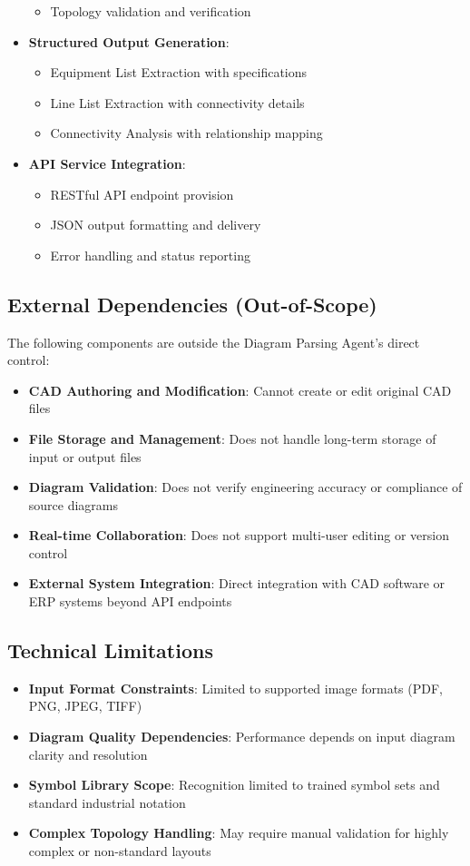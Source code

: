 \documentclass[12pt]{report}
\begin{document}
\begin{itemize}
\begin{itemize}
      \item Topology validation and verification
    \end{itemize}
  \item \textbf{Structured Output Generation}:
    \begin{itemize}
      \item Equipment List Extraction with specifications
      \item Line List Extraction with connectivity details
      \item Connectivity Analysis with relationship mapping
    \end{itemize}
  \item \textbf{API Service Integration}:
    \begin{itemize}
      \item RESTful API endpoint provision
      \item JSON output formatting and delivery
      \item Error handling and status reporting
    \end{itemize}
\end{itemize}

\subsection{External Dependencies (Out-of-Scope)}
The following components are outside the Diagram Parsing Agent's direct control:
\begin{itemize}
  \item \textbf{CAD Authoring and Modification}: Cannot create or edit original CAD files
  \item \textbf{File Storage and Management}: Does not handle long-term storage of input or output files
  \item \textbf{Diagram Validation}: Does not verify engineering accuracy or compliance of source diagrams
  \item \textbf{Real-time Collaboration}: Does not support multi-user editing or version control
  \item \textbf{External System Integration}: Direct integration with CAD software or ERP systems beyond API endpoints
\end{itemize}

\subsection{Technical Limitations}
\begin{itemize}
  \item \textbf{Input Format Constraints}: Limited to supported image formats (PDF, PNG, JPEG, TIFF)
  \item \textbf{Diagram Quality Dependencies}: Performance depends on input diagram clarity and resolution
  \item \textbf{Symbol Library Scope}: Recognition limited to trained symbol sets and standard industrial notation
  \item \textbf{Complex Topology Handling}: May require manual validation for highly complex or non-standard layouts
\end{itemize}
\end{document}
